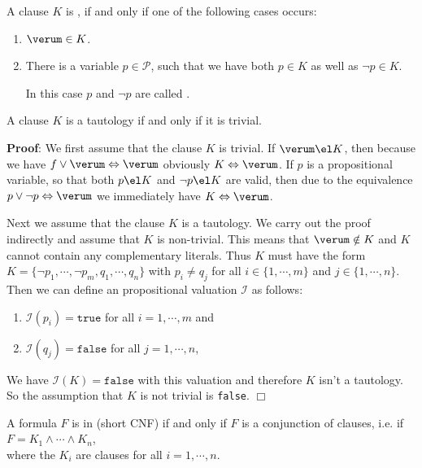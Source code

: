 \begin{Definition}
  A clause $K$ is , if and only if one of the following cases occurs:
  \begin{enumerate}
  \item $\verum \in K$.
  \item There is a variable  $p \in \mathcal{P}$, such that we have both $p \in K$ as well as $\neg p \in K$.

        In this case $p$ and $\neg p$ are called  .
        \eox
\end{enumerate}
\end{Definition}

\begin{Proposition} \label{satz:trivial}
  A clause $K$ is a tautology if and only if it is trivial.
\end{Proposition}
\textbf{Proof}:  We first assume that the clause $K$ is trivial.
If $\verum \el K$, then because we have
$f \vee \verum \Leftrightarrow \verum$
obviously $K \Leftrightarrow \verum$.   If $p$ is a propositional variable, so that
both $p \el K$ and $\neg p \el K$ are valid, then due to the equivalence $p \vee
\neg p \Leftrightarrow \verum$ we immediately have $K \Leftrightarrow \verum$.

Next we assume that the clause $K$ is a tautology.  We carry out the proof
indirectly and assume that $K$ is non-trivial.  This means that $\verum \notin K$ and
$K$ cannot contain any complementary literals.  Thus $K$ must have the form
\\[0.2cm]
\hspace*{1.3cm} 
$K = \{ \neg p_1, \cdots, \neg p_m, q_1, \cdots, q_n \}$ \quad with $p_i
\not= q_j$ for all $i \in \{ 1,\cdots,m\}$ and $j \in \{1, \cdots, n\}$.
\\[0.2cm]
Then we can define an propositional valuation $\mathcal{I}$ as follows:
\begin{enumerate}
\item $\mathcal{I}(p_i) = \texttt{true}$ for all $i = 1, \cdots, m$ and
\item $\mathcal{I}(q_j) = \texttt{false}$ for all $j = 1, \cdots, n$,
\end{enumerate}
We have $\mathcal{I}(K) = \texttt{false}$ with this valuation and therefore $K$ isn't a tautology.  So the
assumption that $K$ is not trivial is \texttt{false}. 
\hspace*{\fill}  $\Box$

\begin{Definition}  
  A formula $F$ is in  (short CNF)
  if and only if $F$ is a conjunction of clauses, i.e. if \\[0.2cm]
  \hspace*{1.3cm} $F = K_1 \wedge \cdots \wedge K_n$, \\[0.2cm]
  where the $K_i$ are clauses for all $i=1,\cdots,n$. \eox
\end{Definition}

